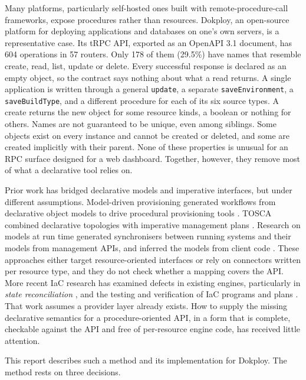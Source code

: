 Many platforms, particularly self-hosted ones built with remote-procedure-call frameworks, expose
procedures rather than resources. Dokploy, an open-source platform for deploying applications and
databases on one's own servers, is a representative case. Its tRPC API, exported as an OpenAPI 3.1
document, has 604 operations in 57 routers. Only 178 of them (29.5\%) have names that resemble create,
read, list, update or delete. Every successful response is declared as an empty object, so the
contract says nothing about what a read returns. A single application is written through a general
\texttt{update}, a separate \texttt{saveEnvironment}, a \texttt{saveBuildType}, and a different procedure for each of its
six source types. A create returns the new object for some resource kinds, a boolean or nothing for
others. Names are not guaranteed to be unique, even among siblings. Some objects exist on every instance and cannot be
created or deleted, and some are created implicitly with their parent. None of these properties is
unusual for an RPC surface designed for a web dashboard. Together, however, they remove most of what
a declarative tool relies on.

Prior work has bridged declarative models and imperative interfaces, but under different
assumptions. Model-driven provisioning generated workflows from declarative object models to drive
procedural provisioning tools \citep{maghraoui2006}.
TOSCA combined declarative topologies with imperative management plans
\citep{breitenbucher2014}. Research on models at run time
generated synchronisers between running systems and their models from management APIs, and inferred
the models from client code \citep{song2010a,song2010b}. These approaches either target
resource-oriented interfaces or rely on connectors written per resource type, and they do not check
whether a mapping covers the API. More recent IaC research has examined defects in existing engines,
particularly in \emph{state reconciliation}
\citep{hassan2024}, and the testing and verification of IaC
programs and plans \citep{sokolowski2024,perdereau2026}. That work assumes a provider layer
already exists. How to supply the missing declarative semantics for a procedure-oriented API, in a form
that is complete, checkable against the API and free of per-resource engine code, has received
little attention.

This report describes such a method and its implementation for Dokploy. The method rests on three
decisions.

